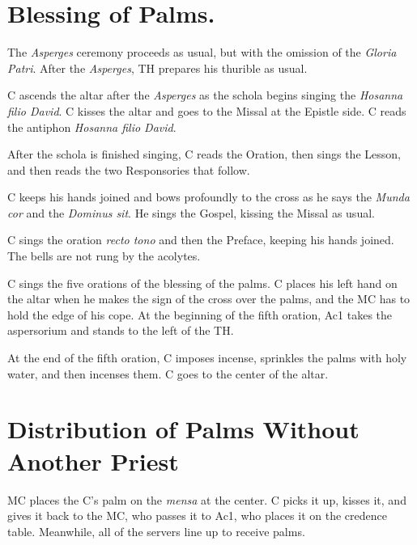 {\begin{enumerate}[label=\Roman*.]
\begin{enumerate}[label=\arabic*.]
			\end{enumerate}

	\end{enumerate}

	\section{Blessing of Palms.}

    \rubric The \textit{Asperges} ceremony proceeds as usual, but with the
    omission of the \textit{Gloria Patri}. After the \textit{Asperges}, TH
    prepares his thurible as usual.

	\rubric C ascends the altar after the \textit{Asperges} as the schola begins
	singing the \textit{Hosanna filio David}. C kisses the altar and goes to
	the Missal at the Epistle side. C reads the antiphon \textit{Hosanna filio
	David}.

    \rubric After the schola is finished singing, C reads the Oration, then
    sings the Lesson, and then reads the two Responsories that follow.

	\rubric C keeps his hands joined and bows profoundly to the cross as he
	says the \textit{Munda cor} and the \textit{Dominus sit}. He sings the
	Gospel, kissing the Missal as usual.

	\rubric C sings the oration \textit{recto tono} and then the Preface,
	keeping his hands joined. The bells are not rung by the acolytes.

	\rubric C sings the five orations of the blessing of the palms. C places
	his left hand on the altar when he makes the sign of the cross over the
	palms, and the MC has to hold the edge of his cope. At the beginning of the
	fifth oration, Ac1 takes the aspersorium and stands to the left of the TH.

	\rubric At the end of the fifth oration, C imposes incense, sprinkles the
	palms with holy water, and then incenses them. C goes to the center of the
	altar.

	\section{Distribution of Palms Without Another Priest}

    \rubric MC places the C's palm on the \textit{mensa} at the center. C picks
    it up, kisses it, and gives it back to the MC, who passes it to Ac1, who
    places it on the credence table. Meanwhile, all of the servers line up to
    receive palms.

}
